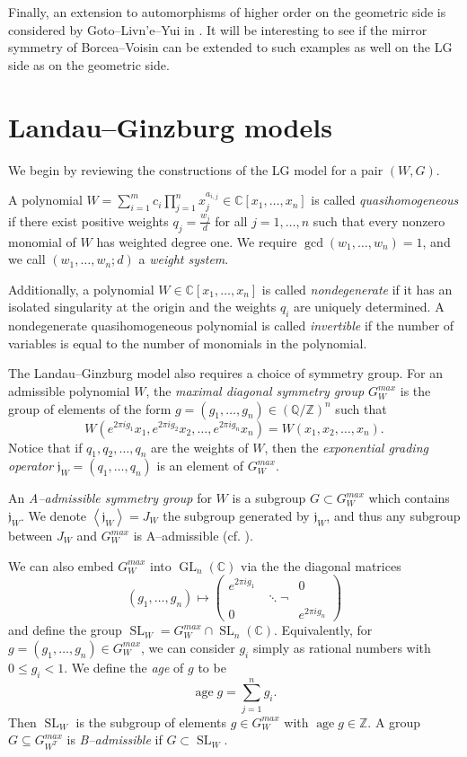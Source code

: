 \documentclass[10pt, letterpaper]{amsart}
\theoremstyle{remark}
\newcommand{\CC}{\mathbb C}
\newcommand{\ZZ}{\mathbb{Z}}
\newcommand{\jw}{\mathfrak{j}}
\newcommand{\defital}{\textit}
\DeclareMathOperator{\SL}{SL}
\DeclareMathOperator{\GL}{GL}
\DeclareMathOperator{\age}{age}
\newcommand{\nathan}[1]{\todo[color=pistachio,fancyline]{N:#1}}
\begin{document}
Finally, an extension to automorphisms of higher order on the geometric side is considered by Goto--Livn'e--Yui in \cite{GLY}. It will be interesting to see if the mirror symmetry of Borcea--Voisin can be extended to such examples as well on the LG side as on the geometric side.\nathan{Check this.} 




\section{Landau--Ginzburg models}\label{sec:LGmodels}
We begin by reviewing the constructions of the LG model for a pair $(W,G)$.

A polynomial 
$
W= \sum_{i=1}^m c_i\prod_{j = 1}^n x_j^{a_{i,j}}  \in \mathbb{C}[x_1, \ldots, x_n]
$
is called \defital{quasihomogeneous} if there exist positive weights $q_j=\tfrac{w_j}{d}$ for all  $j = 1, \ldots, n$ such that every nonzero monomial of $W$ has weighted degree one. We require $\gcd(w_1,\dots,w_n)=1$, and we call $(w_1,\dots,w_n;d)$ a \emph{weight system}.

Additionally, a polynomial $W \in \mathbb{C}[x_1, \ldots, x_n]$ is called \defital{nondegenerate} if it has an isolated singularity at the origin and the weights $q_i$ are uniquely determined.
A nondegenerate quasihomogeneous polynomial is called \emph{invertible} if the number of variables is equal to the number of monomials in the polynomial. 

The Landau--Ginzburg model also requires a choice of symmetry group. 
For an admissible polynomial $W$, the \defital{maximal diagonal symmetry group} $G_W^{max}$ is the group of elements of the form $g = (g_1, \ldots, g_n) \in \left(\mathbb{Q}/\ZZ\right)^n$ such that
\[
W(e^{2\pi i g_1}x_1,e^{2\pi i g_2}x_2,\ldots,e^{2\pi i g_n}x_n) = W(x_1,x_2,\ldots,x_n).
\]
\noindent Notice that if $q_1, q_2, \ldots, q_n$ are the weights of $W$, then the \emph{exponential grading operator} $\jw_W = (q_1, \ldots, q_n)$ is an element of $G_W^{max}$.  

An \defital{A--admissible symmetry group} for $W$ is a subgroup $G\subset G_W^{max}$ which contains $\jw_W$.   We denote $\left\langle \jw_W\right> = J_W$ the subgroup generated by $\jw_W$, and thus any subgroup between $J_W$ and $G_W^{max}$ is A--admissible (cf. \cite{Kr}). 

We can also embed $G_W^{max}$ into $\GL_n(\CC)$ via the the diagonal matrices
\[
(g_1,\dots,g_n)\mapsto \left(\begin{matrix}
                              e^{2\pi i g_1} & & 0 \\
			      & \ddots ¬ \\
			      0& & e^{2\pi i g_n}
                             \end{matrix}
 \right) 
\]
and define the group $\SL_W=G_W^{max}\cap \SL_n(\CC)$. Equivalently, for $g=(g_1,\dots,g_n)\in G^{max}_W$, we can consider $g_i$ simply as rational numbers with $0\leq g_i< 1$. We define the \emph{age} of $g$ to be 
\[
 \age g = \sum_{j=1}^n g_i. 
\]
Then $\SL_W$ is the subgroup of elements $g\in G^{max}_W$ with $\age g\in \ZZ$. A group $G\subseteq G^{max}_{W^T}$ is \emph{B--admissible} if $G\subset \SL_W$.
\end{document}
